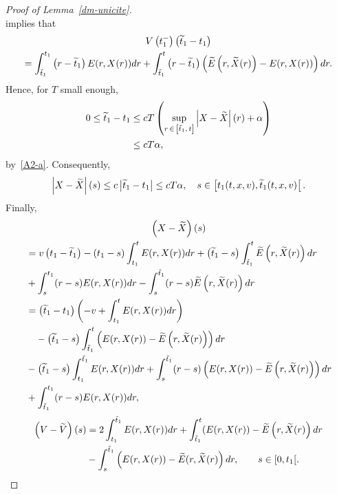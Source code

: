 \documentclass[AHL,Unicode,longabstracts,published]{cedram}
\let\oldtilde\tilde
\renewcommand*{\tilde}[1]{\mathchoice{\widetilde{#1}}{\widetilde{#1}}{\oldtilde{#1}}{\oldtilde{#1}}}
\begin{document}
\begin{proof}[{Proof of Lemma~\ref{dm-unicite}}]
\[\]
implies that
\begin{multline*}
V\left(t_1^-\right)\left(\tilde{t}_1-t_1\right)\\
= \int_{\tilde{t}_1}^{t_1} \left(r-\tilde{t}_1\right)E(r,X(r))dr + \int_{\tilde{t}_1}^t \left(r-\tilde{t}_1\right) \left(\tilde{E}\left(r,\tilde{X}(r)\right)-E(r,X(r)) \right) dr.
\end{multline*}
Hence, for $T$ small enough,
\begin{equation}\label{t1-tTilde1}
\begin{split}
0\leq \tilde{t}_1-t_1&\leq cT\left(\sup_{r\,\in\, \left[\tilde{t}_1,\,t\right]} \left|X-\tilde{X}\right|(r)+\alpha \right) \\
&\leq cT\alpha,
\end{split}
\end{equation}
by~\eqref{A2-a}. Consequently,
\begin{equation}\label{A2-c}
\left|X-\tilde{X}\right|(s) \leq c\left|\tilde{t}_1-t_1\right| \leq cT\alpha, \quad s \in \left[t_1(t,x,v),\tilde{t}_1(t,x,v)\right[.
\end{equation}
Finally,
\begin{multline*}
\left(X-\tilde{X}\right)(s)\\
\begin{aligned}
&= v\left(t_1-\tilde{t}_1\right)-(t_1-s)\int_{t_1}^t E(r,X(r))dr + \left(\tilde{t}_1-s\right)\int_{\tilde{t}_1}^t \tilde{E}\left(r,\tilde{X}(r)\right)dr \\
&+\int_s^{t_1} (r-s) E(r,X(r))dr - \int_s^{\tilde{t}_1} (r-s)\tilde{E}\left(r,\tilde{X}(r)\right)dr\\
&= \left(\tilde{t}_1-t_1\right) \left(-v + \int_{t_1}^t E(r,X(r))dr \right)\\
&\quad-\left(\tilde{t}_1-s\right) \int_{\tilde{t}_1}^t \left (E(r,X(r))-\tilde{E}\left(r,\tilde{X}(r)\right) \right) dr \\
&- \left(\tilde{t}_1-s\right) \int_{t_1}^{\tilde{t}_1} E(r,X(r)) dr + \int_s^{\tilde{t}_1} (r-s) \left(E(r,X(r))-\tilde{E}\left(r,\tilde{X}(r)\right) \right) dr \\
&+ \int_{\tilde{t}_1}^{t_1} (r-s)E(r,X(r)) dr,
\end{aligned}
\end{multline*}
\begin{align*}
\left(V-\tilde{V}\right)(s) &= 2\int_{t_1}^{\tilde{t}_1} E(r,X(r)) dr + \int_{\tilde{t}_1}^t (E(r,X(r))-\tilde{E}\left(r,\tilde{X}(r) \right) dr \\
&- \int_s^{\tilde{t}_1} \left (E(r,X(r))-\tilde{E}(r,\tilde{X}(r) \right) dr, \qquad s \in [0,t_1[.

\end{align*}
\end{proof}
\end{document}
